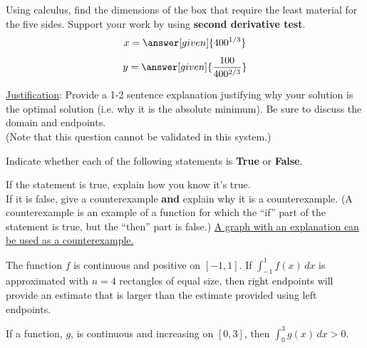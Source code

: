 \documentclass[handout]{ximera}
\begin{document}
\begin{problem}
\begin{question}
Using calculus, find the dimensions of the box that require the least material for the five sides. Support your work by using \textbf{second derivative test}. 
	\[
	\displaystyle  x = \answer[given]{400^{1/3}} 
	\]
	\[
	\displaystyle y = \answer[given]{\frac{100}{400^{2/3}}}
	\]
\end{question}

\begin{question}
\underline{Justification}: Provide a 1-2 sentence explanation justifying why your solution is the optimal solution (i.e. why it is the absolute minimum). Be sure to discuss the domain and endpoints. \\(Note that this question cannot be validated in this system.)
\begin{freeResponse}
\end{freeResponse}
\end{question}

\end{problem}


\begin{problem}
Indicate whether each of the following statements is \textbf{True} or \textbf{False}.
 
If the statement is true, explain how you know it's true.\\
 
If it is false, give a counterexample \textbf{and} explain why it is a counterexample. (A counterexample is an example of a function for which the ``if'' part of the statement is true, but the ``then'' part is false.) \underline{A graph with an explanation can be used as a counterexample.}\\

\begin{question}
The function $f$ is continuous and positive on $[-1,1]$. If $\displaystyle\int_{-1}^1 f(x) \, dx$ is approximated with $n=4$ rectangles of equal size, then right endpoints will provide an estimate that is larger than the estimate provided using left endpoints. 
\begin{multipleChoice}
\end{multipleChoice}
\end{question}

\begin{question}
If a function, $g$, is continuous and increasing on $[0,3]$, then $\displaystyle\int_0^3 g(x)\,dx>0$.
\begin{multipleChoice}
\end{multipleChoice}
\end{question}

\end{problem}
\end{document}
